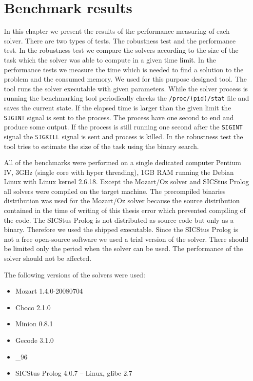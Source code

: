 \chapter{Benchmark results}
\label{results}

In this chapter we present the results of the performance measuring of each solver.
There are two types of tests. The robustness test and the performance test. In the robustness
test we compare the solvers according to the size of the task which the solver
was able to compute in a given time limit. In the performance tests we measure the time 
which is needed to find a solution to the problem and the consumed memory. We used 
for this purpose designed tool. The tool runs the solver executable with given parameters.
While the solver process is running the benchmarking tool periodically checks the \texttt{/proc/(pid)/stat} file
and saves the current state. If the elapsed time is larger than the given limit the 
\texttt{SIGINT} signal is sent to the process. The process have one second to end
and produce some output. If the process is still running one second after the 
\texttt{SIGINT} signal the \texttt{SIGKILL} signal is sent and process is killed. 
In the robustness test the tool tries to estimate the size of the task using the
binary search.

All of the benchmarks were performed on a single dedicated computer Pentium IV, 3GHz (single core 
with hyper threading),
1GB RAM running the Debian Linux with Linux kernel 2.6.18. Except the Mozart/Oz 
solver and SICStus Prolog all solvers were compiled on the target machine. The 
precompiled binaries distribution was used for the Mozart/Oz solver because the
source distribution contained in the time of writing of this thesis error which
prevented compiling of the code. The SICStus Prolog is not distributed as source 
code but only as a binary. Therefore we used the shipped executable. Since the 
SICStus Prolog is not a free open-source software we used a trial version of the solver.
There should be limited only the period when the solver can be used. The performance
of the solver should not be affected.

The following versions of the solvers were used:
\begin{itemize}
  \item Mozart 1.4.0-20080704
  \item Choco 2.1.0
  \item Minion 0.8.1
  \item Gecode 3.1.0
  \item {}\_96
  \item SICStus Prolog 4.0.7 -- Linux, glibc 2.7
\end{itemize}   

